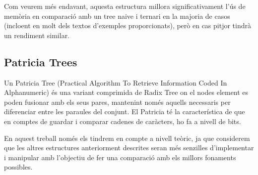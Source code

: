 Com veurem més endavant, aquesta estructura millora significativament l'ús de memòria en comparació amb un tree naive i ternari en la majoria de casos (incloent en molt dels textos d'exemples proporcionats), però en cas pitjor tindrà un rendiment similar.

\subsection{Patricia Trees}
Un Patricia Tree (Practical Algorithm To Retrieve Information Coded In Alphanumeric) és una variant comprimida de Radix Tree on el nodes element es poden fusionar amb els seus pares, mantenint només aquells necessaris per diferenciar entre les paraules del conjunt.
El Patricia té la característica de que en comptes de guardar i comparar cadenes de caràcters, ho fa a nivell de bits.

En aquest treball només els tindrem en compte a nivell teòric, ja que considerem que les altres estructures anteriorment descrites seran més senzilles d'implementar i manipular amb l'objectiu de fer una comparació amb els millors fonaments possibles. 

